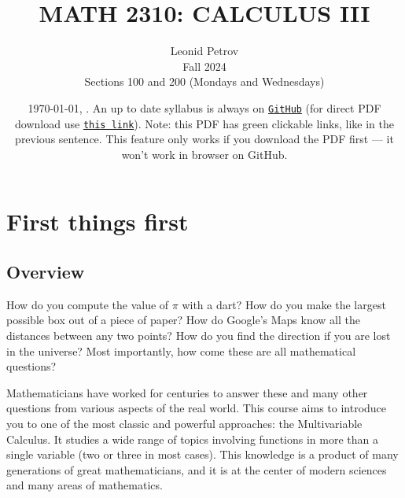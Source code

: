 \documentclass[oneside,11pt]{amsart}
\theoremstyle{definition}
\begin{document}
\title[MATH 2310: CALCULUS III]{MATH 2310: CALCULUS III}
\author{Leonid Petrov\\Fall 2024\\Sections 100 and 200 (Mondays and Wednesdays)}
\date{\today, \currenttime. An up to date syllabus is always on \href{https://github.com/lenis2000/Syllabi/blob/master/Syllabus_2310_f24.pdf}{\textcolor{green!70!black}{\texttt{GitHub}}} (for direct PDF download use \href{https://github.com/lenis2000/Syllabi/raw/master/Syllabus_2310_f24.pdf}{\textcolor{green!70!black}{\texttt{this link}}}). Note: this PDF has green clickable links, like in the previous sentence. This feature only works if you download the PDF first — it won’t work in browser on GitHub.}
\maketitle

\setcounter{tocdepth}{3}

\section{First things first}

\subsection{Overview}

How do you compute the value of $\pi$ with a dart? How do you make the largest possible box out of a piece of paper? How do Google's Maps know all the distances between any two points? How do you find the direction if you are lost in the universe? Most importantly, how come these are all mathematical questions?

Mathematicians have worked for centuries to answer these and many other questions from various aspects of the real world. This course aims to introduce you to one of the most classic and powerful approaches: the Multivariable Calculus. It studies a wide range of topics involving functions in more than a single variable (two or three in most cases). This knowledge is a product of many generations of great mathematicians, and it is at the center of modern sciences and many areas of mathematics. 
\end{document}
